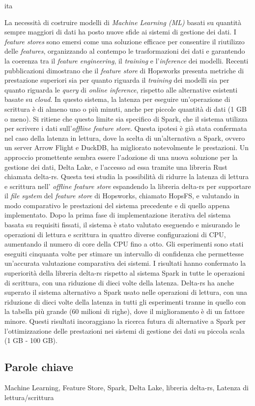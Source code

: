 \markboth{\abstractname}{}
\begin{scontents}[store-env=lang]
ita
\end{scontents}
\begin{scontents}[store-env=abstracts,print-env=true]
La necessità di costruire modelli di \textit{Machine Learning (ML)} basati su quantità sempre maggiori di dati ha posto nuove sfide ai sistemi di gestione dei dati. I \textit{feature stores} sono emersi come una soluzione efficace per consentire il riutilizzo delle \textit{features}, organizzando al contempo le trasformazioni dei dati e garantendo la coerenza tra il \textit{feature engineering}, il \textit{training} e l'\textit{inference} dei modelli. Recenti pubblicazioni dimostrano che il \textit{feature store} di Hopsworks presenta metriche di prestazione superiori sia per quanto riguarda il \textit{training} dei modelli sia per quanto riguarda le \textit{query} di \textit{online inference}, rispetto alle alternative esistenti basate su \textit{cloud}. In questo sistema, la latenza per eseguire un'operazione di scrittura è di almeno uno o più minuti, anche per piccole quantità di dati (1 GB o meno). Si ritiene che questo limite sia specifico di Spark, che il sistema utilizza per scrivere i dati sull'\textit{offline feature store}. Questa ipotesi è già stata confermata nel caso della latenza in lettura, dove la scelta di un'alternativa a Spark, ovvero un server Arrow Flight e DuckDB, ha migliorato notevolmente le prestazioni. Un approccio promettente sembra essere l'adozione di una nuova soluzione per la gestione dei dati, Delta Lake, e l'accesso ad essa tramite una libreria Rust chiamata delta-rs. Questa tesi studia la possibilità di ridurre la latenza di lettura e scrittura nell' \textit{offline feature store}  espandendo la libreria delta-rs per supportare il \textit{file system} del \textit{feature store} di Hopsworks, chiamato HopsFS, e valutando in modo comparativo le prestazioni del sistema precedente e di quello appena implementato. Dopo la prima fase di implementazione iterativa del sistema basata su requisiti fissati, il sistema è stato valutato eseguendo e misurando le operazioni di lettura e scrittura in quattro diverse configurazioni di CPU, aumentando il numero di core della CPU fino a otto. Gli esperimenti sono stati eseguiti cinquanta volte per stimare un intervallo di confidenza che permettesse un'accurata valutazione comparativa dei sistemi. I risultati hanno confermato la superiorità della libreria delta-rs rispetto al sistema Spark in tutte le operazioni di scrittura, con una riduzione di dieci volte della latenza. Delta-rs ha anche superato il sistema alternativo a Spark usato nelle operazioni di lettura, con una riduzione di dieci volte della latenza in tutti gli esperimenti tranne in quello con la tabella più grande (60 milioni di righe), dove il miglioramento è di un fattore minore. Questi risultati incoraggiano la ricerca futura di alternative a Spark per l'ottimizzazione delle prestazioni nei sistemi di gestione dei dati su piccola scala (1 GB - 100 GB).
\end{scontents}
\subsection*{Parole chiave}
\begin{scontents}[store-env=keywords,print-env=true]
Machine Learning, Feature Store, Spark, Delta Lake, libreria delta-rs, Latenza di lettura/scrittura
\end{scontents}